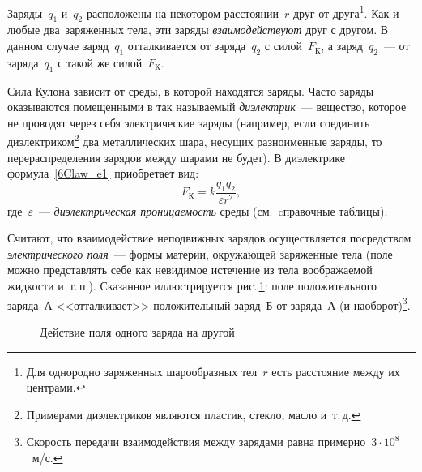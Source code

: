 \documentclass[main.tex]{subfiles}
\begin{document}
Заряды~$q_1$ и~$q_2$ расположены на некотором расстоянии~$r$ друг от друга\footnote{Для однородно заряженных шарообразных тел~$r$ есть расстояние между их центрами.}. Как и любые два~заряженных тела, эти заряды \emph{взаимодействуют} друг с другом. В данном случае заряд~$q_1$ отталкивается от заряда~$q_2$ с силой~$F_\text{К}$, а заряд~$q_2$~--- от заряда~$q_1$ с такой же силой~$F_\text{К}$. 

Сила Кулона зависит от среды, в которой находятся заряды. Часто заряды оказываются помещенными в так называемый \emph{диэлектрик}~--- вещество, которое не проводят через себя электрические заряды (например, если соединить диэлектриком\footnote{Примерами диэлектриков являются пластик, стекло, масло и~т.\,д.} два металлических шара, несущих разноименные заряды, то перераспределения зарядов между шарами не будет). В диэлектрике формула~\eqref{6Claw_e1} приобретает вид:
\begin{equation*}
    F_\text{К}=k\dfrac{q_1q_2}{\varepsilon r^2},
\end{equation*}
где~$\varepsilon$~--- \emph{диэлектрическая проницаемость} среды (см.~cправочные таблицы). 

Считают, что взаимодействие неподвижных зарядов осуществляется посредством \emph{электрического поля}~--- формы материи, окружающей заряженные тела (поле можно представлять себе как невидимое истечение из тела воображаемой жидкости и~т.\,п.). Сказанное иллюстрируется рис.\,\ref{fig:p97}: поле положительного заряда~А <<отталкивает>> положительный заряд~Б от заряда~А (и наоборот)\footnote{Скорость передачи взаимодействия между зарядами равна примерно~$3\cdot10^8$~м/с.}. 


\tikzfading[name=fade out,
inner color=transparent!0,
outer color=transparent!100]

    \begin{figure}[H]
    \centering

\caption{Действие поля одного заряда на другой}
\label{fig:p97}
\end{figure}


















 
\end{document}
